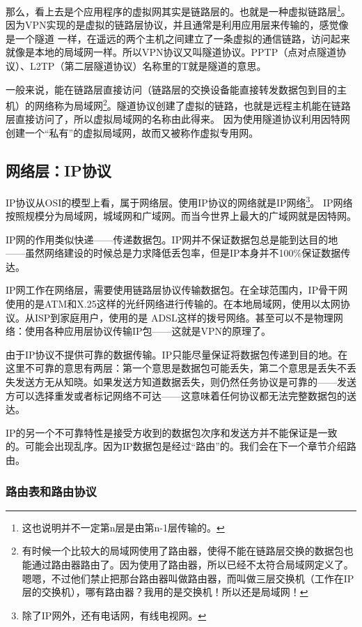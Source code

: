 那么，看上去是个应用程序的虚拟网其实是链路层的。也就是一种虚拟链路层\footnote{这也说明并不一定第n层是由第n-1层传输的。}。
因为VPN实现的是虚拟的链路层协议，并且通常是利用应用层来传输的，感觉像是一个隧道
一样，在遥远的两个主机之间建立了一条虚拟的通信链路，访问起来就像是本地的局域网一样。所以VPN协议又叫隧道协议。PPTP（点对点隧道协议）、L2TP（第二层隧道协议）名称里的T就是隧道的意思。

一般来说，能在链路层直接访问（链路层的交换设备能直接转发数据包到目的主机）的网络称为局域网\footnote{有时候一个比较大的局域网使用了路由器，使得不能在链路层交换的数据包也能通过路由器路由了。因为使用了路由器，所以已经不太符合局域网定义了。嗯嗯，不过他们禁止把那台路由器叫做路由器，而叫做三层交换机（工作在IP层的交换机），哪有路由器？我用的是交换机！所以还是局域网！}。隧道协议创建了虚拟的链路，也就是远程主机能在链路层直接访问了，所以虚拟局域网的名称由此得来。
因为使用隧道协议利用因特网创建一个“私有”的虚拟局域网，故而又被称作虚拟专用网。

\subsection{网络层：IP协议}

IP协议从OSI的模型上看，属于网络层。使用IP协议的网络就是IP网络\footnote{除了IP网外，还有电话网，有线电视网。}。
IP网络按照规模分为局域网，城域网和广域网。而当今世界上最大的广域网就是因特网。

IP网的作用类似快递——传递数据包。IP网并不保证数据包总是能到达目的地——虽然网络建设的时候总是力求降低丢包率，但是IP本身并不100\%保证数据传达。

IP网工作在网络层，需要使用链路层协议传输数据包。在全球范围内，IP骨干网使用的是ATM和X.25这样的光纤网络进行传输的。在本地局域网，使用以太网协议。从ISP到家庭用户，使用的是
ADSL这样的拨号网络。甚至可以不是物理网络：使用各种应用层协议传输IP包——这就是VPN的原理了。

由于IP协议不提供可靠的数据传输。IP只能尽量保证将数据包传递到目的地。在这里不可靠的意思有两层：第一个意思是数据包可能丢失，第二个意思是丢失不丢失发送方无从知晓。如果发送方知道数据丢失，则仍然任务协议是可靠的——发送方可以选择重发或者标记网络不可达——这意味着任何协议都无法完整数据包的送达。

IP的另一个不可靠特性是接受方收到的数据包次序和发送方并不能保证是一致的。可能会出现乱序。因为IP数据包是经过“路由”的。我们会在下一个章节介绍路由。

\subsubsection{路由表和路由协议}

